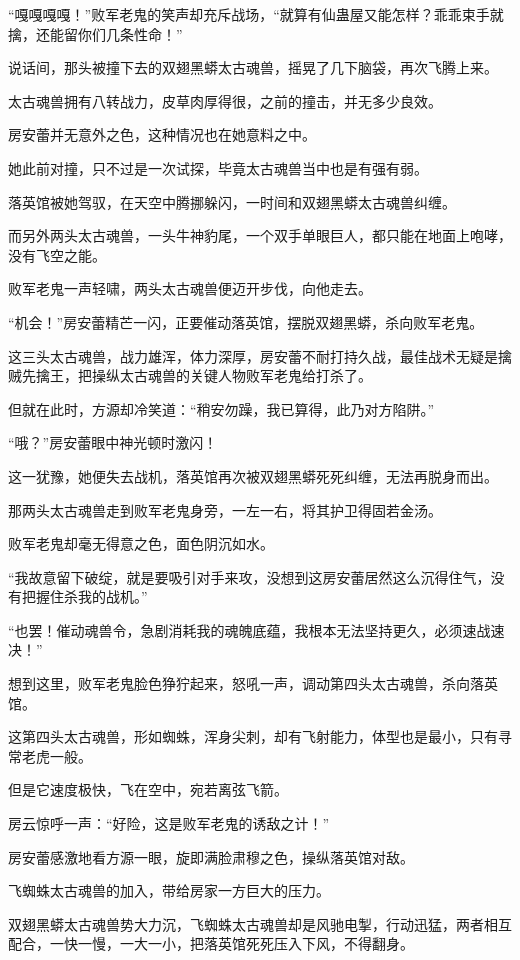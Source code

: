 \begin{this_body}
“嘎嘎嘎嘎！”败军老鬼的笑声却充斥战场，“就算有仙蛊屋又能怎样？乖乖束手就擒，还能留你们几条性命！”

说话间，那头被撞下去的双翅黑蟒太古魂兽，摇晃了几下脑袋，再次飞腾上来。

太古魂兽拥有八转战力，皮草肉厚得很，之前的撞击，并无多少良效。

房安蕾并无意外之色，这种情况也在她意料之中。

她此前对撞，只不过是一次试探，毕竟太古魂兽当中也是有强有弱。

落英馆被她驾驭，在天空中腾挪躲闪，一时间和双翅黑蟒太古魂兽纠缠。

而另外两头太古魂兽，一头牛神豹尾，一个双手单眼巨人，都只能在地面上咆哮，没有飞空之能。

败军老鬼一声轻啸，两头太古魂兽便迈开步伐，向他走去。

“机会！”房安蕾精芒一闪，正要催动落英馆，摆脱双翅黑蟒，杀向败军老鬼。

这三头太古魂兽，战力雄浑，体力深厚，房安蕾不耐打持久战，最佳战术无疑是擒贼先擒王，把操纵太古魂兽的关键人物败军老鬼给打杀了。

但就在此时，方源却冷笑道：“稍安勿躁，我已算得，此乃对方陷阱。”

“哦？”房安蕾眼中神光顿时激闪！

这一犹豫，她便失去战机，落英馆再次被双翅黑蟒死死纠缠，无法再脱身而出。

那两头太古魂兽走到败军老鬼身旁，一左一右，将其护卫得固若金汤。

败军老鬼却毫无得意之色，面色阴沉如水。

“我故意留下破绽，就是要吸引对手来攻，没想到这房安蕾居然这么沉得住气，没有把握住杀我的战机。”

“也罢！催动魂兽令，急剧消耗我的魂魄底蕴，我根本无法坚持更久，必须速战速决！”

想到这里，败军老鬼脸色狰狞起来，怒吼一声，调动第四头太古魂兽，杀向落英馆。

这第四头太古魂兽，形如蜘蛛，浑身尖刺，却有飞射能力，体型也是最小，只有寻常老虎一般。

但是它速度极快，飞在空中，宛若离弦飞箭。

房云惊呼一声：“好险，这是败军老鬼的诱敌之计！”

房安蕾感激地看方源一眼，旋即满脸肃穆之色，操纵落英馆对敌。

飞蜘蛛太古魂兽的加入，带给房家一方巨大的压力。

双翅黑蟒太古魂兽势大力沉，飞蜘蛛太古魂兽却是风驰电掣，行动迅猛，两者相互配合，一快一慢，一大一小，把落英馆死死压入下风，不得翻身。


\end{this_body}

